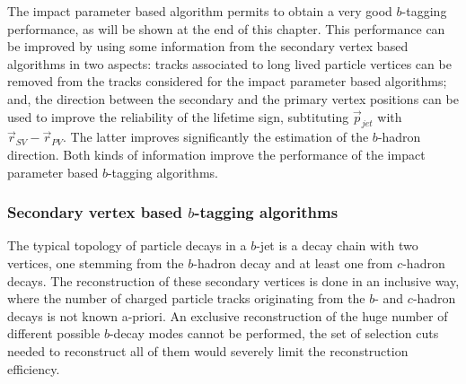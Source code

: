 The impact parameter based algorithm permits to obtain a very good $b$-tagging performance, as will be shown at the end of this chapter. 
This performance can be improved by using some information from the secondary vertex based algorithms in two aspects: tracks associated to long lived particle vertices can be removed from the tracks considered for the impact parameter based algorithms; and, the direction between the secondary and the primary vertex positions can be used to improve the reliability of the lifetime sign, subtituting $\vec{p}_{jet}$ with $\vec{r}_{SV} - \vec{r}_{PV} $. The latter improves significantly the estimation of the $b$-hadron direction. Both kinds of information improve the performance of the impact parameter based $b$-tagging algorithms.


\subsubsection{Secondary vertex based $b$-tagging algorithms }

The typical topology of particle decays in a $b$-jet is a decay chain with two vertices, one stemming from the $b$-hadron decay and at least one from $c$-hadron decays. The reconstruction of these secondary vertices is done in an inclusive way, where the number of charged particle tracks originating from the $b$- and $c$-hadron decays is not known a-priori. An exclusive reconstruction of the huge number of different possible $b$-decay modes cannot be performed, the set of selection cuts needed to reconstruct all of them would severely limit the reconstruction efficiency.

